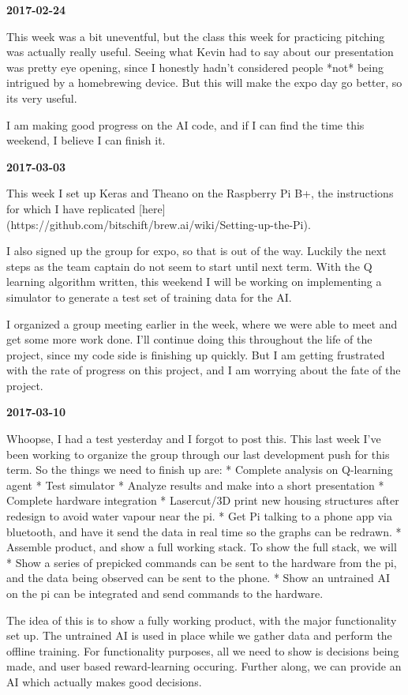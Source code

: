 \textbf{2017-02-24}

This week was a bit uneventful, but the class this week for practicing pitching was actually really useful.
Seeing what Kevin had to say about our presentation was pretty eye opening, since I honestly hadn't considered people *not* being intrigued by a homebrewing device. But this will make the expo day go better, so its very useful.

I am making good progress on the AI code, and if I can find the time this weekend, I believe I can finish it.

\textbf{2017-03-03}

This week I set up Keras and Theano on the Raspberry Pi B+, the instructions for which I have replicated [here](https://github.com/bitschift/brew.ai/wiki/Setting-up-the-Pi).

I also signed up the group for expo, so that is out of the way. Luckily the next steps as the team captain do not seem to start until next term.
With the Q learning algorithm written, this weekend I will be working on implementing a simulator to generate a test set of training data for the AI.

I organized a group meeting earlier in the week, where we were able to meet and get some more work done. I'll continue doing this throughout the life of the project, since my code side is finishing up quickly. But I am getting frustrated with the rate of progress on this project, and I am worrying about the fate of the project.

\textbf{2017-03-10}

Whoopse, I had a test yesterday and I forgot to post this.
This last week I've been working to organize the group through our last development push for this term.
So the things we need to finish up are:
* Complete analysis on Q-learning agent
  * Test simulator
  * Analyze results and make into a short presentation
* Complete hardware integration
  * Lasercut/3D print new housing structures after redesign to avoid water vapour near the pi.
  * Get Pi talking to a phone app via bluetooth, and have it send the data in real time so the graphs can be redrawn.
  * Assemble product, and show a full working stack. To show the full stack, we will
     * Show a series of prepicked commands can be sent to the hardware from the pi, and the data being observed can be sent to the phone.
     * Show an untrained AI on the pi can be integrated and send commands to the hardware.

    The idea of this is to show a fully working product, with the major functionality set up. The untrained AI is used in place while we gather data and perform the offline training. For functionality purposes, all we need to show is decisions being made, and user based reward-learning occuring. Further along, we can provide an AI which actually makes good decisions.

